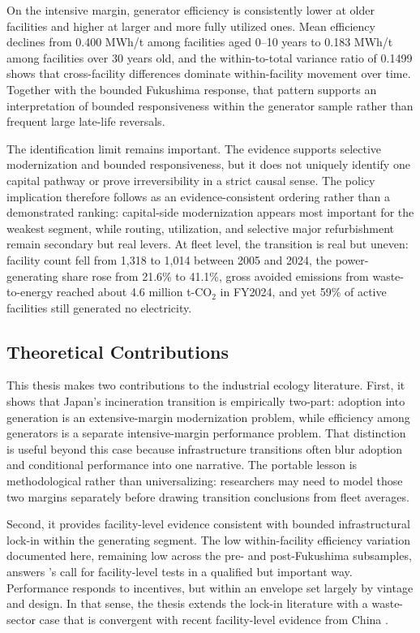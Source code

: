 \documentclass[12pt,a4paper]{article}
\begin{document}
On the intensive margin, generator efficiency is consistently lower at older facilities and higher at larger and more fully utilized ones. Mean efficiency declines from 0.400 MWh/t among facilities aged 0--10 years to 0.183 MWh/t among facilities over 30 years old, and the within-to-total variance ratio of 0.1499 shows that cross-facility differences dominate within-facility movement over time. Together with the bounded Fukushima response, that pattern supports an interpretation of bounded responsiveness within the generator sample rather than frequent large late-life reversals.

The identification limit remains important. The evidence supports selective modernization and bounded responsiveness, but it does not uniquely identify one capital pathway or prove irreversibility in a strict causal sense. The policy implication therefore follows as an evidence-consistent ordering rather than a demonstrated ranking: capital-side modernization appears most important for the weakest segment, while routing, utilization, and selective major refurbishment remain secondary but real levers. At fleet level, the transition is real but uneven: facility count fell from 1,318 to 1,014 between 2005 and 2024, the power-generating share rose from 21.6\% to 41.1\%, gross avoided emissions from waste-to-energy reached about 4.6 million t-CO$_2$ in FY2024, and yet 59\% of active facilities still generated no electricity.

\subsection{Theoretical Contributions}

This thesis makes two contributions to the industrial ecology literature. First, it shows that Japan's incineration transition is empirically two-part: adoption into generation is an extensive-margin modernization problem, while efficiency among generators is a separate intensive-margin performance problem. That distinction is useful beyond this case because infrastructure transitions often blur adoption and conditional performance into one narrative. The portable lesson is methodological rather than universalizing: researchers may need to model those two margins separately before drawing transition conclusions from fleet averages.

Second, it provides facility-level evidence consistent with bounded infrastructural lock-in within the generating segment. The low within-facility efficiency variation documented here, remaining low across the pre- and post-Fukushima subsamples, answers \citet{Seto2016}'s call for facility-level tests in a qualified but important way. Performance responds to incentives, but within an envelope set largely by vintage and design. In that sense, the thesis extends the lock-in literature with a waste-sector case that is convergent with recent facility-level evidence from China \citep{Cui2026}.
\end{document}

